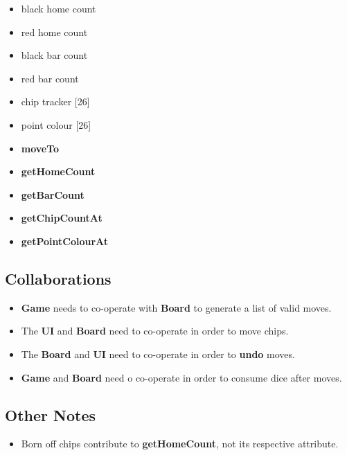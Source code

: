 \begin{multicols}{2}
    \begin{itemize} [itemsep=2pt,parsep=2pt]
        \subsection{Attributes}
        \item black home count
        \item red home count
        \item black bar count
        \item red bar count
        \item chip tracker [26]
        \item point colour [26]
    \end{itemize}

    \begin{itemize} [itemsep=2pt,parsep=2pt]
        \subsection{Behaviour}
        \item \textbf{moveTo}
        \item \textbf{getHomeCount}
        \item \textbf{getBarCount}
        \item \textbf{getChipCountAt}
        \item \textbf{getPointColourAt}
    \end{itemize}
\end{multicols}

\subsection{Collaborations}
\begin{itemize} [itemsep=2pt,parsep=2pt]
    \item \textbf{Game} needs to co-operate with \textbf{Board} to generate a list of valid moves.
    \item The \textbf{UI} and \textbf{Board} need to co-operate in order to move chips.
    \item The \textbf{Board} and \textbf{UI} need to co-operate in order to \textbf{undo} moves.
    \item \textbf{Game} and \textbf{Board} need o co-operate in order to consume dice after moves.
\end{itemize}

\subsection{Other Notes}
\begin{itemize}
    \item Born off chips contribute to \textbf{getHomeCount}, not its respective attribute.
\end{itemize}
